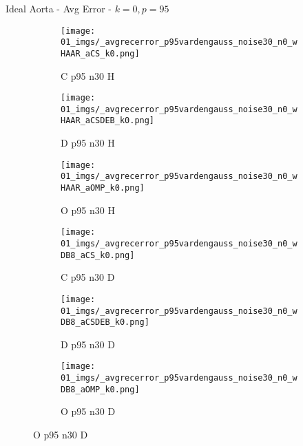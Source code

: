 \begin{frame}{Ideal Aorta - Avg Error - $k=0,p=95$}{}
\begin{figure}
\begin{subfigure}{0.13\textwidth}
\texttt{[image: 01\_imgs/\_avgrecerror\_p95vardengauss\_noise30\_n0\_wHAAR\_aCS\_k0.png]}
\caption*{\tiny C p95 n30 H}
\end{subfigure}
\begin{subfigure}{0.13\textwidth}
\texttt{[image: 01\_imgs/\_avgrecerror\_p95vardengauss\_noise30\_n0\_wHAAR\_aCSDEB\_k0.png]}
\caption*{\tiny D p95 n30 H}
\end{subfigure}
\begin{subfigure}{0.13\textwidth}
\texttt{[image: 01\_imgs/\_avgrecerror\_p95vardengauss\_noise30\_n0\_wHAAR\_aOMP\_k0.png]}
\caption*{\tiny O p95 n30 H}
\end{subfigure}
\begin{subfigure}{0.13\textwidth}
\texttt{[image: 01\_imgs/\_avgrecerror\_p95vardengauss\_noise30\_n0\_wDB8\_aCS\_k0.png]}
\caption*{\tiny C p95 n30 D}
\end{subfigure}
\begin{subfigure}{0.13\textwidth}
\texttt{[image: 01\_imgs/\_avgrecerror\_p95vardengauss\_noise30\_n0\_wDB8\_aCSDEB\_k0.png]}
\caption*{\tiny D p95 n30 D}
\end{subfigure}
\begin{subfigure}{0.13\textwidth}
\texttt{[image: 01\_imgs/\_avgrecerror\_p95vardengauss\_noise30\_n0\_wDB8\_aOMP\_k0.png]}
\caption*{\tiny O p95 n30 D}
\end{subfigure}
\end{figure}
\end{frame}


